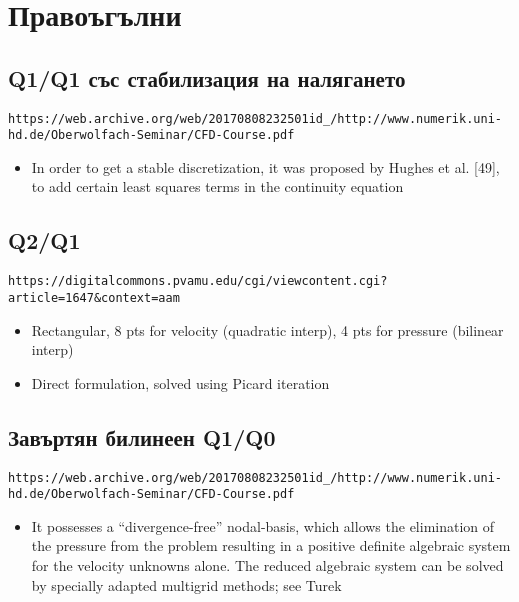 \documentclass[fleqn,12pt]{article}
\begin{document}
\section{Правоъгълни}

\subsection{Q1/Q1 със стабилизация на налягането}
\begin{verbatim}
https://web.archive.org/web/20170808232501id_/http://www.numerik.uni-hd.de/Oberwolfach-Seminar/CFD-Course.pdf
\end{verbatim}
    \begin{itemize}
        \item In order to get a stable discretization, it was proposed by Hughes et al. [49],
        to add certain least squares terms in the continuity equation
\end{itemize}
    

\subsection{Q2/Q1}
\begin{verbatim}
https://digitalcommons.pvamu.edu/cgi/viewcontent.cgi?article=1647&context=aam    
\end{verbatim}
\begin{itemize}
    \item Rectangular, 8 pts for velocity (quadratic interp), 4 pts for pressure (bilinear interp)
    \item Direct formulation, solved using Picard iteration
\end{itemize}

\subsection{Завъртян билинеен Q1/Q0}
\begin{verbatim}
https://web.archive.org/web/20170808232501id_/http://www.numerik.uni-hd.de/Oberwolfach-Seminar/CFD-Course.pdf
\end{verbatim}
\begin{itemize}
    \item It possesses a “divergence-free” nodal-basis, which allows the elimination of the pressure from the problem resulting in a positive definite algebraic
system for the velocity unknowns alone. The reduced algebraic system can be
solved by specially adapted multigrid methods; see Turek
\end{itemize}
\end{document}
